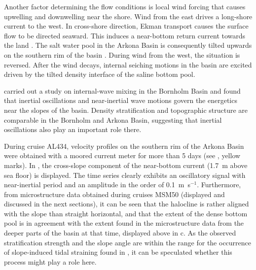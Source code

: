 Another factor determining the flow conditions is local wind forcing 
that causes upwelling and downwelling near the shore. Wind from the east 
drives a long-shore current to the west. In cross-shore direction, Ekman 
transport causes the surface flow to be directed seaward. This induces a 
near-bottom return current towards the land \citep[][]{lass1993}. The salt 
water pool in the Arkona Basin is consequently tilted upwards on the 
southern rim of the basin \citep[][their Fig.\ 11]{lass2003, lass1993}. During 
wind from the west, the situation is reversed. After the wind decays, 
internal seiching motions in the basin are excited driven by the tilted 
density interface of the saline bottom pool.

\cite{vanderlee2011} carried out a study on internal-wave mixing in the 
Bornholm Basin and found that inertial oscillations and near-inertial wave 
motions govern the energetics near the slopes of the basin. Density 
stratification and topographic structure are comparable in the Bornholm and 
Arkona Basin, suggesting that inertial oscillations also play an important role 
there.

 During cruise AL434, velocity profiles on the southern rim of the Arkona Basin 
were obtained with a moored current meter for more than 5 days (see 
, yellow marks). In , the cross-slope component of 
the near-bottom current (1.7~m above sea floor) is displayed. The time series 
clearly exhibits an oscillatory signal with near-inertial period and an 
amplitude in the order of 0.1~m~s$^{-1}$. Furthermore, from microstructure data 
obtained during cruises MSM50 (displayed and discussed in the next sections), 
it can be seen that the halocline is rather aligned with the slope than straight 
horizontal, and that the extent of the dense bottom pool is in agreement with 
the extent found in the microstructure data from the deeper parts of the basin 
at that time, displayed above in c. As the observed 
stratification strength and the slope angle are within the range for the 
occurrence of slope-induced tidal straining found in \cite{schulzumlauf2016}, 
it can be speculated whether this process might play a role here.

